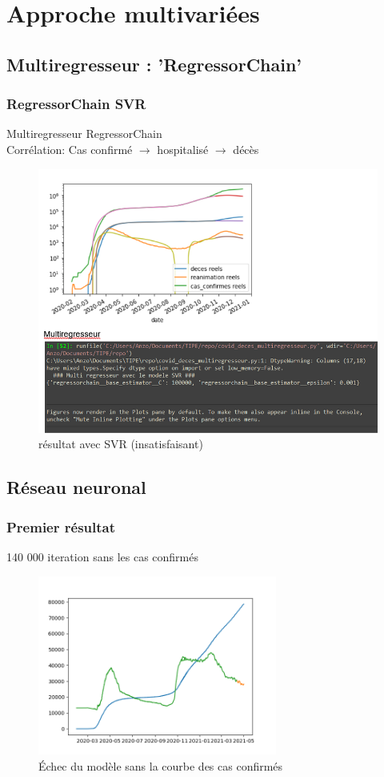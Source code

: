 \documentclass{beamer}
\begin{document}
\section{Approche multivariées}
\subsection{Multiregresseur : 'RegressorChain'}
\begin{frame}
	\frametitle{RegressorChain SVR}
	Multiregresseur RegressorChain\\ Corrélation: Cas confirmé $\rightarrow$ hospitalisé $\rightarrow$ décès 
	
	\begin{figure}[h]
		\includegraphics[scale=0.45]{mulitregr_epic_fail}%
		\caption{résultat avec SVR (insatisfaisant)}
	\end{figure}
\end{frame}

\subsection{Réseau neuronal}
\begin{frame}
	\frametitle{Premier résultat}
	140 000 iteration sans les cas confirmés
	\begin{figure}[h]
		\centering
		\includegraphics[width=0.7\textwidth]{NN mlpregressor 140k iter (updated data)}
		\caption{Échec du modèle sans la courbe des cas confirmés}
	\end{figure}
\end{frame}
\end{document}

